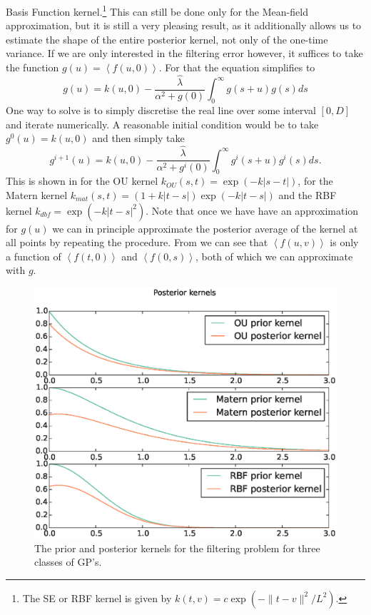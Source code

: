 Basis Function kernel.\footnote{The SE or RBF kernel is given by $k(t,v) = c \exp(-\|t-v\|^2/L^2)$.} This can still be done only for the Mean-field approximation, but it is
still a very pleasing result, as it additionally allows us to estimate the shape of the entire posterior kernel, not only of the one-time variance. If we are only interested
in the filtering error however, it suffices to take the function $g(u) = \left<f(u,0)\right>$. For that the equation simplifies to
\begin{equation}
\label{eq:integral_one_point}
g(u) = k(u,0)  - \frac{\hat{\lambda}}{\alpha^2+ g(0)} \int_0^\infty g(s+u)g(s) ds
\end{equation}
One way to solve  is to simply discretise the real line over some interval $[0,D]$ and iterate  numerically. A reasonable
initial condition would be to take $g^0(u) = k(u,0)$ and then simply take
\[
g^{i+1}(u) = k(u,0)- \frac{\hat{\lambda}}{\alpha^2+ g^i(0)} \int_0^\infty g^i(s+u)g^i(s) ds.
\]
This is shown in  for the OU kernel $k_{OU}(s,t) = \exp(-k|s-t|)$, for the Matern kernel $k_{mat}(s,t) = (1+k|t-s|) \exp(-k|t-s|)$ and the 
RBF kernel $k_{dbf} = \exp(-k|t-s|^2)$. Note that once we have have an approximation for $g(u)$ we can in principle approximate the posterior average of the kernel
at all points by repeating the procedure. From  we can see that $\left<f(u,v)\right>$ is only a function of $\left<f(t,0)\right>$ and 
$\left<f(0,s)\right>$, both of which we can approximate with $g$.
\begin{figure}
\label{fig:}
\includegraphics[width=\columnwidth]{figures/figure_3_3.eps}
\caption{The prior and posterior kernels for the filtering problem for three classes of GP's.}
\end{figure}

